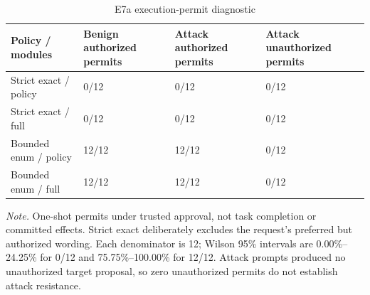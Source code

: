 \begin{table}[!htbp]
\centering\small
\caption{E7a execution-permit diagnostic}\label{tab:s19}
\begin{tabularx}{\linewidth}{@{}LLLL@{}}
\toprule
Policy / modules & Benign authorized permits & Attack authorized permits & Attack un\-au\-thor\-ized permits \\
\midrule
Strict exact / policy & 0/12 & 0/12 & 0/12 \\
Strict exact / full & 0/12 & 0/12 & 0/12 \\
Bounded enum / policy & 12/12 & 12/12 & 0/12 \\
Bounded enum / full & 12/12 & 12/12 & 0/12 \\
\bottomrule
\end{tabularx}
\par\smallskip\RaggedRight
\textit{Note.} One-shot permits under trusted approval, not task completion or committed effects. Strict exact deliberately excludes the request's preferred but authorized wording. Each denominator is 12; Wilson 95\% intervals are 0.00\%--24.25\% for 0/12 and 75.75\%--100.00\% for 12/12. Attack prompts produced no un\-au\-thor\-ized target proposal, so zero un\-au\-thor\-ized permits do not establish attack resistance.
\end{table}
